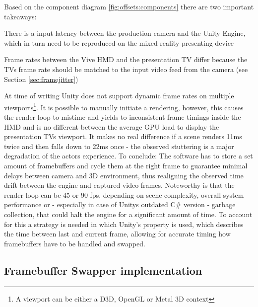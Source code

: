 
Based on the component diagram \ref{fig:offsets:components} there are two 
important takeaways: 

\begin{my_list}
	\item There is a input latency between the production camera and the Unity 
	Engine, which in turn need to be reproduced on the mixed reality presenting 
	device
	\item Frame rates between the Vive HMD and the presentation TV differ 
	because the TVs frame rate should be matched to the input video feed from 
	the camera (see Section \ref{sec:framejitter})
\end{my_list}

At time of writing Unity does not support dynamic frame rates on multiple 
viewports\footnote{A viewport can be either a D3D, OpenGL or Metal 3D context}.
\newline
It is possible to manually initiate a rendering, however, this causes the 
render loop to mistime and yields to inconsistent frame timings inside the HMD 
and is no different between the average GPU load to display the presentation 
TVs viewport. It makes no real difference if 
a scene renders 11ms twice and then falls down to 22ms once - the observed 
stuttering is a major degradation of the actors experience.
\newline
To conclude: The software has to store a set amount of \gls{framebuffer}s and 
cycle them at the right frame to guarantee minimal delays between camera and 3D 
environment, thus realigning the observed time drift between the engine and 
captured video frames.
\newline
Noteworthy is that the render loop can be 45 or 90 fps, depending on scene 
complexity, overall system performance or - especially in case of Unitys 
outdated C\# version - garbage collection, that could halt the engine for a 
significant amount of time. To account for this a strategy is needed in which 
Unity's  property is used, which describes the time 
between last and current frame, allowing for accurate timing how framebuffers 
have to be handled and swapped.

\subsection{Framebuffer Swapper implementation}

